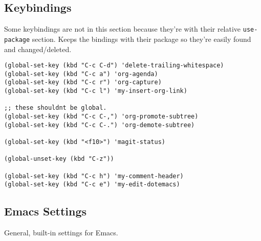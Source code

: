 \documentclass[11pt]{article}
\begin{document}
\subsection{Keybindings}
\label{sec-1-4}

Some keybindings are not in this section because they're with their relative \texttt{use-package}
section. Keeps the bindings with their package so they're easily found and changed/deleted.

\begin{verbatim}
(global-set-key (kbd "C-c C-d") 'delete-trailing-whitespace)
(global-set-key (kbd "C-c a") 'org-agenda)
(global-set-key (kbd "C-c r") 'org-capture)
(global-set-key (kbd "C-c l") 'my-insert-org-link)

;; these shouldnt be global.
(global-set-key (kbd "C-c C-,") 'org-promote-subtree)
(global-set-key (kbd "C-c C-.") 'org-demote-subtree)

(global-set-key (kbd "<f10>") 'magit-status)

(global-unset-key (kbd "C-z"))

(global-set-key (kbd "C-c h") 'my-comment-header)
(global-set-key (kbd "C-c e") 'my-edit-dotemacs)
\end{verbatim}
\subsection{Emacs Settings}
\label{sec-1-5}

General, built-in settings for Emacs.
\end{document}
